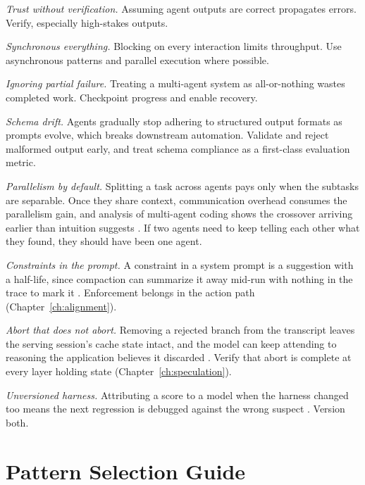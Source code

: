 \documentclass[11pt]{book}
\begin{document}
\textit{Trust without verification.} Assuming agent outputs are correct propagates errors. Verify, especially high-stakes outputs.

\textit{Synchronous everything.} Blocking on every interaction limits throughput. Use asynchronous patterns and parallel execution where possible.

\textit{Ignoring partial failure.} Treating a multi-agent system as all-or-nothing wastes completed work. Checkpoint progress and enable recovery.

\textit{Schema drift.} Agents gradually stop adhering to structured output formats as prompts evolve, which breaks downstream automation. Validate and reject malformed output early, and treat schema compliance as a first-class evaluation metric.

\textit{Parallelism by default.} Splitting a task across agents pays only when the subtasks are separable. Once they share context, communication overhead consumes the parallelism gain, and analysis of multi-agent coding shows the crossover arriving earlier than intuition suggests \cite{cohesion2026}. If two agents need to keep telling each other what they found, they should have been one agent.

\textit{Constraints in the prompt.} A constraint in a system prompt is a suggestion with a half-life, since compaction can summarize it away mid-run with nothing in the trace to mark it \cite{govdecay2026}. Enforcement belongs in the action path (Chapter~\ref{ch:alignment}).

\textit{Abort that does not abort.} Removing a rejected branch from the transcript leaves the serving session's cache state intact, and the model can keep attending to reasoning the application believes it discarded \cite{abortedkv2026}. Verify that abort is complete at every layer holding state (Chapter~\ref{ch:speculation}).

\textit{Unversioned harness.} Attributing a score to a model when the harness changed too means the next regression is debugged against the wrong suspect \cite{modelharness2026}. Version both.

\section{Pattern Selection Guide}
\end{document}
